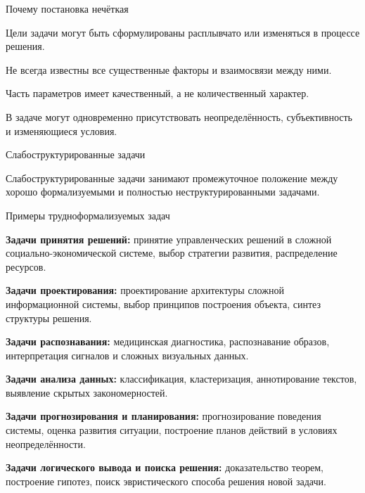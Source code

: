 \begin{frame}{Почему постановка нечёткая}
	\topline
	\justifying
	
	\begin{textitemize}
		\item Цели задачи могут быть сформулированы расплывчато или изменяться в процессе решения.
		\item Не всегда известны все существенные факторы и взаимосвязи между ними.
		\item Часть параметров имеет качественный, а не количественный характер.
		\item В задаче могут одновременно присутствовать неопределённость, субъективность и изменяющиеся условия.
	\end{textitemize}
\end{frame}

\begin{frame}{Слабоструктурированные задачи}
	\topline
	\justifying
	
	\begin{SCn}
	\end{SCn}
	
	Слабоструктурированные задачи занимают промежуточное положение между хорошо формализуемыми и полностью неструктурированными задачами.
\end{frame}

\begin{frame}{Примеры трудноформализуемых задач}
	\topline
	\justifying
	
	\footnotesize
	\vspace{10mm}
	
	\begin{textitemize}
		\item \textbf{Задачи принятия решений:} принятие управленческих решений в сложной социально-экономической системе, выбор стратегии развития, распределение ресурсов.
		\item \textbf{Задачи проектирования:} проектирование архитектуры сложной информационной системы, выбор принципов построения объекта, синтез структуры решения.
		\item \textbf{Задачи распознавания:} медицинская диагностика, распознавание образов, интерпретация сигналов и сложных визуальных данных.
		\item \textbf{Задачи анализа данных:} классификация, кластеризация, аннотирование текстов, выявление скрытых закономерностей.
		\item \textbf{Задачи прогнозирования и планирования:} прогнозирование поведения системы, оценка развития ситуации, построение планов действий в условиях неопределённости.
		\item \textbf{Задачи логического вывода и поиска решения:} доказательство теорем, построение гипотез, поиск эвристического способа решения новой задачи.
	\end{textitemize}
\end{frame}

